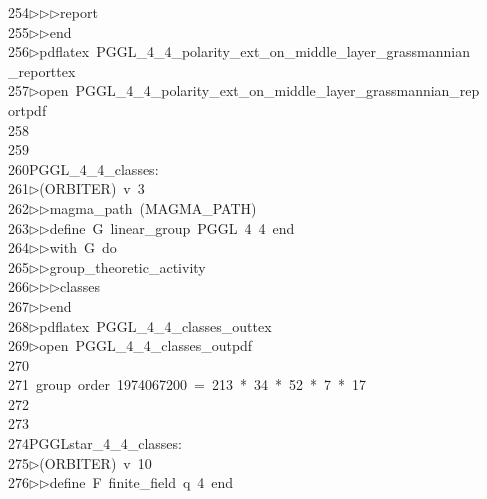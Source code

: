 \begin{tabbing}
254\>$\triangleright$\>$\triangleright$\>$\triangleright$\>report\ \\[0pt]
255\>$\triangleright$\>$\triangleright$\>end\\[0pt]
256\>$\triangleright$\>pdflatex\ PGGL\_4\_4\_polarity\_ext\_on\_middle\_layer\_grassmannian\\[0pt]
\>\_reporttex\\[0pt]
257\>$\triangleright$\>open\ PGGL\_4\_4\_polarity\_ext\_on\_middle\_layer\_grassmannian\_rep\\[0pt]
\>ortpdf\\[0pt]
258\>\\[0pt]
259\>\\[0pt]
260\>PGGL\_4\_4\_classes:\\[0pt]
261\>$\triangleright$\>(ORBITER)\ v\ 3\ \\[0pt]
262\>$\triangleright$\>$\triangleright$\>magma\_path\ (MAGMA\_PATH)\ \\[0pt]
263\>$\triangleright$\>$\triangleright$\>define\ G\ linear\_group\ PGGL\ 4\ 4\ end\ \\[0pt]
264\>$\triangleright$\>$\triangleright$\>with\ G\ do\ \\[0pt]
265\>$\triangleright$\>$\triangleright$\>group\_theoretic\_activity\ \\[0pt]
266\>$\triangleright$\>$\triangleright$\>$\triangleright$\>classes\ \\[0pt]
267\>$\triangleright$\>$\triangleright$\>end\\[0pt]
268\>$\triangleright$\>pdflatex\ PGGL\_4\_4\_classes\_outtex\\[0pt]
269\>$\triangleright$\>open\ PGGL\_4\_4\_classes\_outpdf\\[0pt]
270\>\\[0pt]
271\>\ group\ order\ 1974067200\ =\ 213\ *\ 34\ *\ 52\ *\ 7\ *\ 17\\[0pt]
272\>\\[0pt]
273\>\\[0pt]
274\>PGGLstar\_4\_4\_classes:\\[0pt]
275\>$\triangleright$\>(ORBITER)\ v\ 10\ \\[0pt]
276\>$\triangleright$\>$\triangleright$\>define\ F\ finite\_field\ q\ 4\ end\ \\[0pt]

\end{tabbing}
